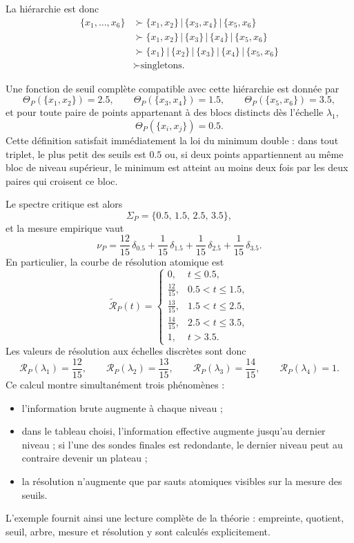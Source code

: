 \documentclass[11pt,a4paper]{article}
\begin{document}
La hiérarchie est donc
\[
\begin{aligned}
\{x_1,\ldots,x_6\}
&\succ \{x_1,x_2\}\,|\,\{x_3,x_4\}\,|\,\{x_5,x_6\}\\
&\succ \{x_1,x_2\}\,|\,\{x_3\}\,|\,\{x_4\}\,|\,\{x_5,x_6\}\\
&\succ \{x_1\}\,|\,\{x_2\}\,|\,\{x_3\}\,|\,\{x_4\}\,|\,\{x_5,x_6\}\\
&\succ \text{singletons.}
\end{aligned}
\]

Une fonction de seuil complète compatible avec cette hiérarchie est donnée par
\[
\Theta_P(\{x_1,x_2\})=2.5,\qquad
\Theta_P(\{x_3,x_4\})=1.5,\qquad
\Theta_P(\{x_5,x_6\})=3.5,
\]
et pour toute paire de points appartenant à des blocs distincts dès l'échelle \(\lambda_1\),
\[
\Theta_P(\{x_i,x_j\})=0.5.
\]
Cette définition satisfait immédiatement la loi du minimum double : dans tout triplet, le plus petit des seuils est \(0.5\) ou, si deux points appartiennent au même bloc de niveau supérieur, le minimum est atteint au moins deux fois par les deux paires qui croisent ce bloc.

Le spectre critique est alors
\[
\Sigma_P=\{0.5,\,1.5,\,2.5,\,3.5\},
\]
et la mesure empirique vaut
\[
\nu_P
=
\frac{12}{15}\,\delta_{0.5}
+\frac{1}{15}\,\delta_{1.5}
+\frac{1}{15}\,\delta_{2.5}
+\frac{1}{15}\,\delta_{3.5}.
\]
En particulier, la courbe de résolution atomique est
\[
\widetilde{\mathcal R}_P(t)=
\begin{cases}
0, & t\le 0.5,\\[0.3em]
\frac{12}{15}, & 0.5<t\le 1.5,\\[0.3em]
\frac{13}{15}, & 1.5<t\le 2.5,\\[0.3em]
\frac{14}{15}, & 2.5<t\le 3.5,\\[0.3em]
1, & t>3.5.
\end{cases}
\]
Les valeurs de résolution aux échelles discrètes sont donc
\[
\mathcal R_P(\lambda_1)=\frac{12}{15},\qquad
\mathcal R_P(\lambda_2)=\frac{13}{15},\qquad
\mathcal R_P(\lambda_3)=\frac{14}{15},\qquad
\mathcal R_P(\lambda_4)=1.
\]
Ce calcul montre simultanément trois phénomènes :
\begin{itemize}[leftmargin=1.4em]
\item l'information brute augmente à chaque niveau ;
\item dans le tableau choisi, l'information effective augmente jusqu'au dernier niveau ; si l'une des sondes finales est redondante, le dernier niveau peut au contraire devenir un plateau ;
\item la résolution n'augmente que par sauts atomiques visibles sur la mesure des seuils.
\end{itemize}
L'exemple fournit ainsi une lecture complète de la théorie : empreinte, quotient, seuil, arbre, mesure et résolution y sont calculés explicitement.
\end{document}
